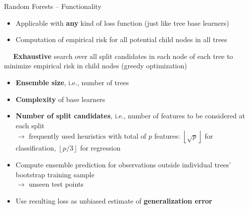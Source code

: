 \begin{frame}{Random Forests -- Functionality}


\begin{itemize}
  \item Applicable with \textbf{any} kind of loss function (just like tree base 
  learners)
  \item Computation of empirical risk for all potential child nodes in all trees
\end{itemize}

\medskip

 ~~
\textbf{Exhaustive} search over all split candidates in each node of each tree
to minimize empirical risk in child nodes (greedy optimization) \\

\medskip


\begin{itemize}
  \item \textbf{Ensemble size}, i.e., number of trees
  \item \textbf{Complexity} of base learners
  \item \textbf{Number of split candidates}, i.e., number of features to be
  considered at each split \\
  $\rightarrow$ frequently used heuristics with total of $p$ features: 
  $\left \lfloor{\sqrt{p}}\right \rfloor$ for classification,
  $\left \lfloor{p/3}\right \rfloor$ for regression
\end{itemize}

\medskip

\begin{itemize}
  \item Compute ensemble prediction for observations outside individual 
  trees' bootstrap training sample \\ $\rightarrow$ unseen test points
  \item Use resulting loss as unbiased estimate of \textbf{generalization error}
\end{itemize}

  
\end{frame}


